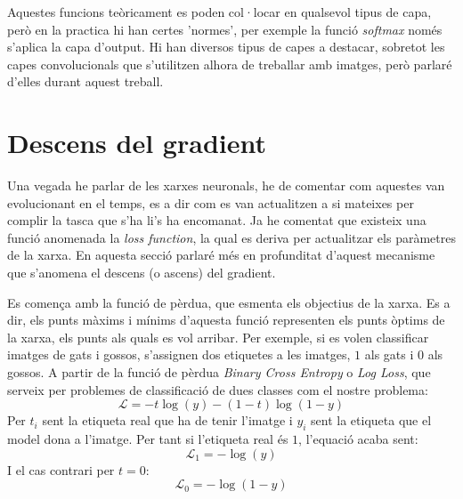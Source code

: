 Aquestes funcions teòricament es poden col·locar en qualsevol tipus de capa, però en la practica hi han certes 'normes', per exemple la funció \textit{softmax} només s'aplica la capa d'output. Hi han diversos tipus de capes a destacar, sobretot les capes convolucionals que s'utilitzen alhora de treballar amb imatges, però parlaré d'elles durant aquest treball.

\section{Descens del gradient}
Una vegada he parlar de les xarxes neuronals, he de comentar com aquestes van evolucionant en el temps, es a dir com es van actualitzen a si mateixes per complir la tasca que s'ha li's ha encomanat. Ja he comentat que existeix una funció anomenada la \textit{loss function}, la qual es deriva per actualitzar els paràmetres de la xarxa. En aquesta secció parlaré més en profunditat d'aquest mecanisme que s'anomena el descens (o ascens) del gradient.

Es comença amb la funció de pèrdua, que esmenta els objectius de la xarxa. Es a dir, els punts màxims i mínims d'aquesta funció representen els punts òptims de la xarxa, els punts als quals es vol arribar. Per exemple, si es volen classificar imatges de gats i gossos, s'assignen dos etiquetes a les imatges, $1$ als gats i $0$ als gossos. A partir de la funció de pèrdua \textit{Binary Cross Entropy} o \textit{Log Loss}, que serveix per problemes de classificació de dues classes com el nostre problema:
$$
\mathcal{L} = - t\log(y) - (1 - t)\log(1 - y) 
$$
Per $t_i$ sent la etiqueta real que ha de tenir l'imatge i $y_i$ sent la etiqueta que el model dona a l'imatge. Per tant si l'etiqueta real és $1$, l'equació acaba sent:
$$
\mathcal{L}_1 = - \log(y)
$$
I el cas contrari per $t = 0$:
$$
\mathcal{L}_0 = - \log(1 - y)
$$

